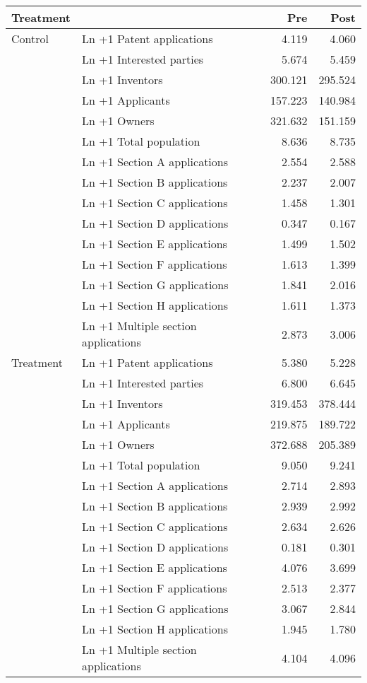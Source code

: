 
\begin{tabular}[t]{llrr}
\toprule
Treatment &   & Pre & Post\\
\midrule
Control & Ln +1 Patent applications & \num{4.119} & \num{4.060}\\
 & Ln +1 Interested parties & \num{5.674} & \num{5.459}\\
 & Ln +1 Inventors & \num{300.121} & \num{295.524}\\
 & Ln +1 Applicants & \num{157.223} & \num{140.984}\\
 & Ln +1 Owners & \num{321.632} & \num{151.159}\\
 & Ln +1 Total population & \num{8.636} & \num{8.735}\\
 & Ln +1 Section A applications & \num{2.554} & \num{2.588}\\
 & Ln +1 Section B applications & \num{2.237} & \num{2.007}\\
 & Ln +1 Section C applications & \num{1.458} & \num{1.301}\\
 & Ln +1 Section D applications & \num{0.347} & \num{0.167}\\
 & Ln +1 Section E applications & \num{1.499} & \num{1.502}\\
 & Ln +1 Section F applications & \num{1.613} & \num{1.399}\\
 & Ln +1 Section G applications & \num{1.841} & \num{2.016}\\
 & Ln +1 Section H applications & \num{1.611} & \num{1.373}\\
 & Ln +1 Multiple section applications & \num{2.873} & \num{3.006}\\
Treatment & Ln +1 Patent applications & \num{5.380} & \num{5.228}\\
 & Ln +1 Interested parties & \num{6.800} & \num{6.645}\\
 & Ln +1 Inventors & \num{319.453} & \num{378.444}\\
 & Ln +1 Applicants & \num{219.875} & \num{189.722}\\
 & Ln +1 Owners & \num{372.688} & \num{205.389}\\
 & Ln +1 Total population & \num{9.050} & \num{9.241}\\
 & Ln +1 Section A applications & \num{2.714} & \num{2.893}\\
 & Ln +1 Section B applications & \num{2.939} & \num{2.992}\\
 & Ln +1 Section C applications & \num{2.634} & \num{2.626}\\
 & Ln +1 Section D applications & \num{0.181} & \num{0.301}\\
 & Ln +1 Section E applications & \num{4.076} & \num{3.699}\\
 & Ln +1 Section F applications & \num{2.513} & \num{2.377}\\
 & Ln +1 Section G applications & \num{3.067} & \num{2.844}\\
 & Ln +1 Section H applications & \num{1.945} & \num{1.780}\\
 & Ln +1 Multiple section applications & \num{4.104} & \num{4.096}\\
\bottomrule
\end{tabular}
